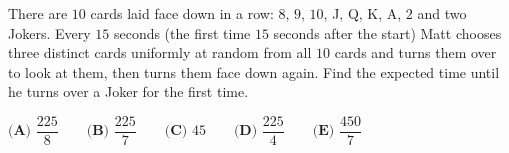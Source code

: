 There are $10$ cards laid face down in a row: $8$, $9$, $10$, J, Q, K, A, $2$ and two Jokers. Every $15$ seconds (the first time $15$ seconds after the start) Matt chooses three distinct cards uniformly at random from all $10$ cards and turns them over to look at them, then turns them face down again. Find the expected time until he turns over a Joker for the first time.

$\textbf{(A) }\dfrac{225}{8}\qquad\textbf{(B) }\dfrac{225}{7}\qquad\textbf{(C) }45\qquad\textbf{(D) }\dfrac{225}{4}\qquad\textbf{(E) }\dfrac{450}{7}$
